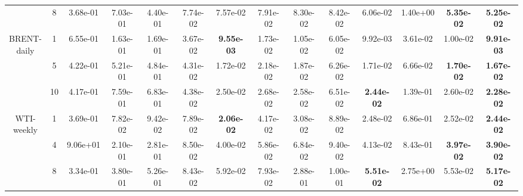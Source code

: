\begin{table*}[!t]
{\begin{tabular}{cccccccccccccc}
                                     & 8                  & 3.68e-01                        & 7.03e-01                     & 4.40e-01                   & 7.74e-02                     & 7.57e-02          & 7.91e-02          & 8.30e-02 & 8.42e-02 & 6.06e-02          & 1.40e+00 & \textbf{5.35e-02} & \textbf{5.25e-02}\s \\ \cmidrule(l){2-14}
            \multirowcell{3}{BRENT-\\daily} & 1                  & 6.55e-01                        & 1.63e-01                     & 1.69e-01                   & 3.67e-02                     & \textbf{9.55e-03}\s & 1.73e-02          & 1.05e-02 & 6.05e-02 & 9.92e-03          & 3.61e-02 & 1.00e-02          & \textbf{9.91e-03} \\ \cmidrule(l){3-14}
                                     & 5                  & 4.22e-01                        & 5.21e-01                     & 4.84e-01                   & 4.31e-02                     & 1.72e-02          & 2.18e-02          & 1.87e-02 & 6.26e-02 & 1.71e-02          & 6.66e-02 & \textbf{1.70e-02} & \textbf{1.67e-02}\s \\ \cmidrule(l){3-14}
                                     & 10                 & 4.17e-01                        & 7.59e-01                     & 6.83e-01                   & 4.38e-02                     & 2.50e-02          & 2.68e-02          & 2.58e-02 & 6.51e-02 & \textbf{2.44e-02} & 1.39e-01 & 2.60e-02          & \textbf{2.28e-02}\s \\ \cmidrule(l){2-14}
            \multirowcell{3}{WTI-\\weekly}   & 1                  & 3.69e-01                        & 7.82e-02                     & 9.42e-02                   & 7.89e-02                     & \textbf{2.06e-02}\s  & 4.17e-02          & 3.08e-02 & 8.89e-02 & 2.48e-02          & 6.86e-01 & 2.52e-02          & \textbf{2.44e-02}\\ \cmidrule(l){3-14}
                                     & 4                  & 9.06e+01                        & 2.10e-01                     & 2.81e-01                   & 8.50e-02                     & 4.00e-02          & 5.86e-02          & 6.84e-02 & 9.40e-02 & 4.13e-02          & 8.43e-01 & \textbf{3.97e-02} & \textbf{3.90e-02}\s \\ \cmidrule(l){3-14}
                                     & 8                  & 3.34e-01                        & 3.80e-01                     & 5.26e-01                   & 8.43e-02                     & 5.92e-02          & 7.93e-02          & 2.88e-01 & 1.00e-01 & \textbf{5.51e-02} & 2.75e+00 & 5.53e-02          & \textbf{5.17e-02}\s \\ \cmidrule(l){2-14}

\end{tabular}}
\end{table*}
